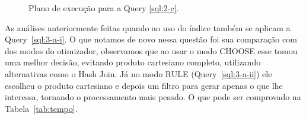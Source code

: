 \documentclass[a4paper,12pt]{article}
\begin{document}
\begin{figure}[hpt]
   \begin{center}
      \ContinuedFloat
   \end{center}
   \caption{Plano de execução para a Query \ref{sql:2-c}.}
\end{figure}

As análises anteriormente feitas quando ao uso do índice também se aplicam
a Query~\ref{sql:3-a-i}. O que notamos de novo nessa questão foi sua comparação
com dos modos do otimizador, observamos que ao usar o modo CHOOSE esse tomou uma
melhor decisão, evitando produto cartesiano completo, utilizando alternativas
como o Hash Join. Já no modo RULE (Query~\ref{sql:3-a-ii}) ele escolheu o produto
cartesiano e depois um filtro para gerar apenas o que lhe interessa, tornando
o processamento mais pesado.  O que pode ser comprovado na Tabela~\ref{tab:tempo}.

\begin{program}
   
   \caption{Pergunta 3 baseada em ``not in'' com otimizador no modo CHOOSE.}
   \label{sql:3-a-i}
\end{program}
\end{document}
